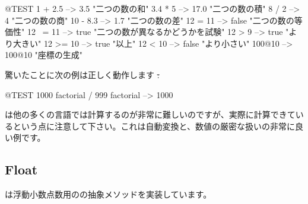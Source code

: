 \documentclass[a4paper,10pt,twoside]{book}
\begin{document}
\begin{code}{@TEST}
1 + 2.5     --> 3.5             "二つの数の和"
3.4 * 5      --> 17.0           "二つの数の積"
8 / 2         --> 4                 "二つの数の商"
10 - 8.3   --> 1.7              "二つの数の差"
12 = 11    --> false           "二つの数の等価性"
12 ~= 11 --> true            "二つの数が異なるかどうかを試験"
12 > 9      --> true            "より大きい"
12 >= 10  --> true            "以上"
12 < 10    --> false           "より小さい"
100@10   --> 100@10    "座標の生成"
\end{code}

驚いたことに次の例は正しく動作します \st:
\begin{code}{@TEST}
1000 factorial / 999 factorial --> 1000
\end{code}
は他の多くの言語では計算するのが非常に難しいのですが、実際に計算できているという点に注意して下さい。これは自動変換と、数値の厳密な扱いの非常に良い例です。


\subsection{Float}

は浮動小数点数用のの抽象メソッドを実装しています。
\end{document}
